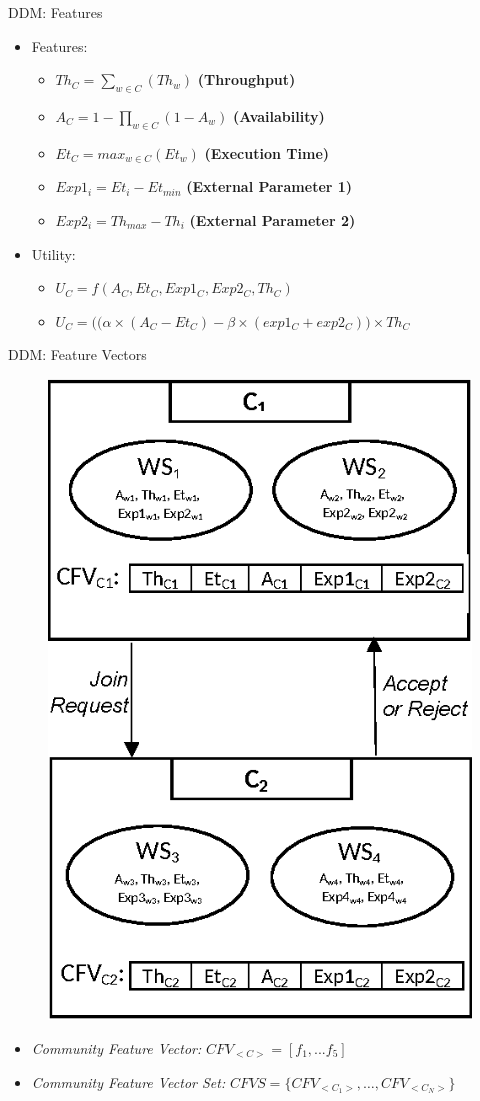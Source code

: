 \documentclass{beamer}
\begin{document}
\begin{frame}{DDM: Features}
    \begin{itemize}
        \item Features:
        \begin{itemize}
            \item $Th_{C} = \sum_{w \in C}{(Th_{w})}$ \textbf{(Throughput)}
            \item $A_{C} = 1-\prod_{w \in C}{(1-A_{w})}$ \textbf{(Availability)}
            \item $Et_{C} = max_{w \in C}{(Et_{w})}$ \textbf{(Execution Time)}
            \item $Exp1_i = Et_{i} - Et_{min}$ \textbf{(External Parameter 1)}
            \item $Exp2_i = Th_{max} - Th_{i}$ \textbf{(External Parameter 2)}
        \end{itemize}
        \item Utility:
        \begin{itemize}
            \item $U_{C} = f(A_{C}, Et_{C}, Exp1_{C}, Exp2_{C}, Th_{C})$
            \item $U_{C} = \big((\alpha \times (A_{C} - Et_{C}) - \beta \times (exp1_{C} + exp2_{C})\big) \times Th_{C}$
        \end{itemize}
    \end{itemize}
\end{frame}

\begin{frame}{DDM: Feature Vectors}

    \begin{figure}[htbp]
        \centering
        \includegraphics[width=0.35 \columnwidth]{figures/cfvs.eps}
    \end{figure}

    \footnotesize
    \begin{itemize}
        \item \emph{Community Feature Vector:} $CFV_{<C>} = [f_1,...f_5]$
        \item \emph{Community Feature Vector Set:} $CFVS = \{CFV_{<C_1>}, \dots, CFV_{<C_N>}\}$
    \end{itemize}
\end{frame}
\end{document}
